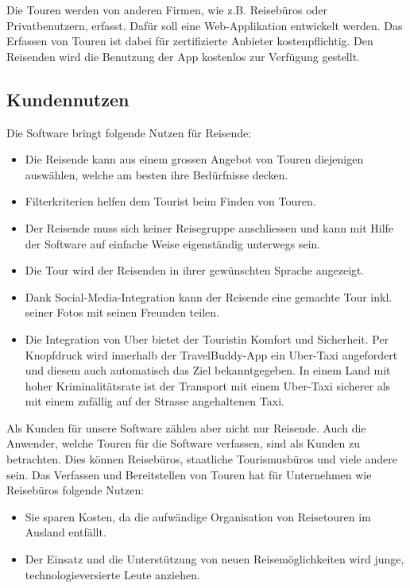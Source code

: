 Die Touren werden von anderen Firmen, wie z.B. Reisebüros oder Privatbenutzern, erfasst. Dafür
soll eine Web-Applikation entwickelt werden. Das Erfassen von Touren ist dabei für zertifizierte
Anbieter kostenpflichtig. Den Reisenden wird die Benutzung der App kostenlos zur Verfügung gestellt.

\subsection{Kundennutzen}\label{Kundennutzen}
Die Software bringt folgende Nutzen für Reisende:

\begin{itemize}
\item Die Reisende kann aus einem grossen Angebot von Touren diejenigen auswählen, welche am besten ihre Bedürfnisse decken.
\item Filterkriterien helfen dem Tourist beim Finden von Touren.
\item Der Reisende muss sich keiner Reisegruppe anschliessen und kann mit Hilfe der Software auf einfache Weise eigenständig unterwegs sein.
\item Die Tour wird der Reisenden in ihrer gewünschten Sprache angezeigt.
\item Dank Social-Media-Integration kann der Reisende eine gemachte Tour inkl. seiner Fotos mit seinen Freunden teilen.
\item Die Integration von Uber bietet der Touristin Komfort und Sicherheit. Per Knopfdruck wird innerhalb der TravelBuddy-App
  ein Uber-Taxi angefordert und diesem auch automatisch das Ziel bekanntgegeben. In einem Land mit hoher Kriminalitätsrate ist
  der Transport mit einem Uber-Taxi sicherer als mit einem zufällig auf der Strasse angehaltenen Taxi.
\end{itemize}

Als Kunden für unsere Software zählen aber nicht nur Reisende. Auch die Anwender, welche Touren für die
Software verfassen, sind als Kunden zu betrachten. Dies können Reisebüros, staatliche Tourismusbüros
und viele andere sein. Das Verfassen und Bereitstellen von Touren hat für Unternehmen wie Reisebüros folgende Nutzen:

\begin{itemize}
\item Sie sparen Kosten, da die aufwändige Organisation von Reisetouren im Ausland entfällt.
\item Der Einsatz und die Unterstützung von neuen Reisemöglichkeiten wird junge, technologieversierte Leute anziehen.
\end{itemize}

